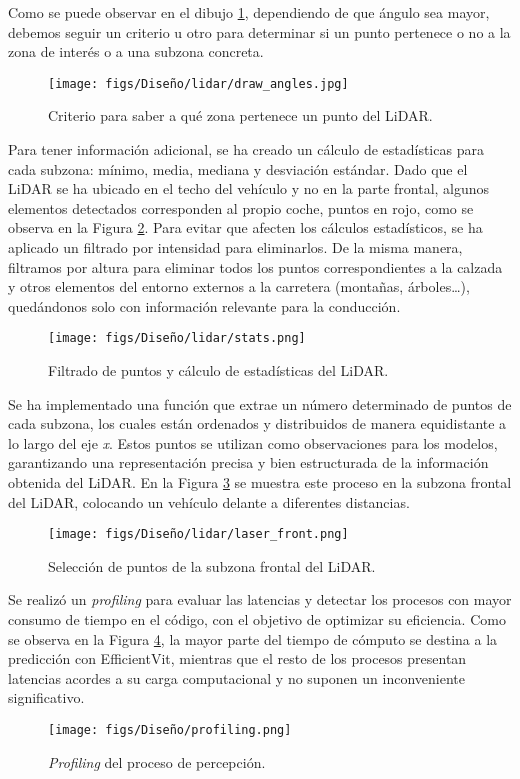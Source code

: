 \newpage

Como se puede observar en el dibujo \ref{fig:dib_angle}, dependiendo de que ángulo sea mayor, debemos seguir un criterio u otro para determinar si un punto pertenece o no a la zona de interés o a una subzona concreta.
\begin{figure}[ht]
  \centering
  \texttt{[image: figs/Diseño/lidar/draw\_angles.jpg]}
  \caption{Criterio para saber a qué zona pertenece un punto del \ac{LiDAR}.}
  \label{fig:dib_angle}
\end{figure}

Para tener información adicional, se ha creado un cálculo de estadísticas para cada subzona: mínimo, media, mediana y desviación estándar. Dado que el \ac{LiDAR} se ha ubicado en el techo del vehículo y no en la parte frontal, algunos elementos detectados corresponden al propio coche, puntos en rojo, como se observa en la Figura \ref{fig:stats_lidar}. Para evitar que afecten los cálculos estadísticos, se ha aplicado un filtrado por intensidad para eliminarlos. De la misma manera, filtramos por altura para eliminar todos los puntos correspondientes a la calzada y otros elementos del entorno externos a la carretera (montañas, árboles…), quedándonos solo con información relevante para la conducción.
\begin{figure}[ht]
  \centering
  \texttt{[image: figs/Diseño/lidar/stats.png]}
  \caption{Filtrado de puntos y cálculo de estadísticas del \ac{LiDAR}.}
  \label{fig:stats_lidar}
\end{figure}

\newpage

Se ha implementado una función que extrae un número determinado de puntos de cada subzona, los cuales están ordenados y distribuidos de manera equidistante a lo largo del eje \textit{x}. Estos puntos se utilizan como observaciones para los modelos, garantizando una representación precisa y bien estructurada de la información obtenida del \ac{LiDAR}. En la Figura \ref{fig:laser_front} se muestra este proceso en la subzona frontal del \ac{LiDAR}, colocando un vehículo delante a diferentes distancias.
\begin{figure}[ht]
\centering
\texttt{[image: figs/Diseño/lidar/laser\_front.png]}
\caption{Selección de puntos de la subzona frontal del \ac{LiDAR}.}
\label{fig:laser_front}
\end{figure}

Se realizó un \textit{profiling} para evaluar las latencias y detectar los procesos con mayor consumo de tiempo en el código, con el objetivo de optimizar su eficiencia. Como se observa en la Figura \ref{fig:profiling}, la mayor parte del tiempo de cómputo se destina a la predicción con EfficientVit, mientras que el resto de los procesos presentan latencias acordes a su carga computacional y no suponen un inconveniente significativo.
\begin{figure}[ht]
  \centering
  \texttt{[image: figs/Diseño/profiling.png]}
  \caption{\textit{Profiling} del proceso de percepción.}
  \label{fig:profiling}
\end{figure}


